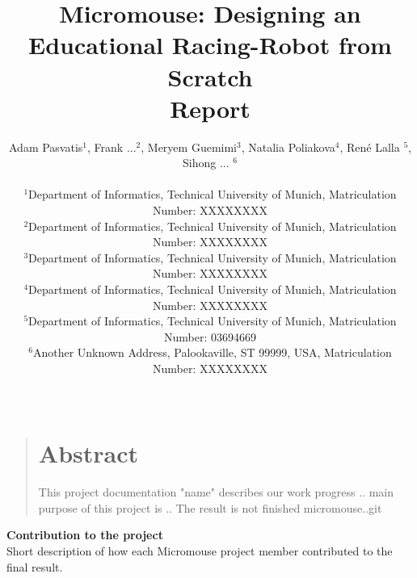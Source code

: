 \documentclass[12pt]{article}
\title{Micromouse: Designing an Educational Racing-Robot from Scratch \\Report}
\author
{Adam Pasvatis$^{1}$, Frank ...$^{2}$, Meryem Guemimi$^{3}$, Natalia Poliakova$^{4}$, René Lalla $^{5}$, Sihong ... $^{6}$\\
\\
\normalsize{$^{1}$Department of Informatics, Technical University of Munich, Matriculation Number: XXXXXXXX}\\
\normalsize{$^{2}$Department of Informatics, Technical University of Munich, Matriculation Number: XXXXXXXX}\\
\normalsize{$^{3}$Department of Informatics, Technical University of Munich, Matriculation Number: XXXXXXXX}\\
\normalsize{$^{4}$Department of Informatics, Technical University of Munich, Matriculation Number: XXXXXXXX}\\
\normalsize{$^{5}$Department of Informatics, Technical University of Munich, Matriculation Number: 03694669}\\
\normalsize{$^{6}$Another Unknown Address, Palookaville, ST 99999, USA, Matriculation Number: XXXXXXXX}\\
\\
}
\date{}
\newenvironment{sciabstract}{%
\begin{quote} \bf}
{\end{quote}}
\begin{document}

\baselineskip24pt


\maketitle

\newpage

\begin{sciabstract}
  \section*{Abstract}
    This project documentation "name" describes our work progress ..
    main purpose of this project is ..
    The result is not finished micromouse..git

\end{sciabstract}

\newpage

\Large \textbf{Contribution to the project}\\

\normalsize Short description of how each Micromouse project member contributed to the final result.
\end{document}
